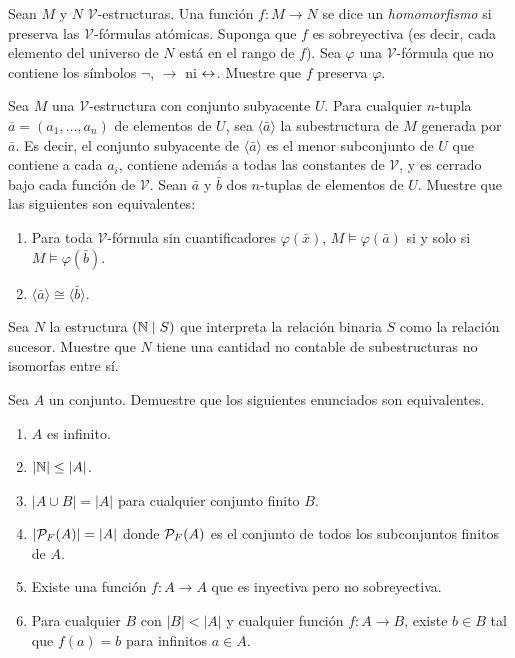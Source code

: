 \message{ !name(main.tex)}\documentclass[12pt,a4paper]{book}
\newcommand{\VV}{\mathcal{V}}
\begin{document}
    \begin{ejercicio}
        Sean $M$ y $N$ $\VV$-estructuras. Una función $f:M\rightarrow N$ se dice un \textit{homomorfismo} si preserva las
        $\VV$-fórmulas atómicas. Suponga que $f$ es sobreyectiva (es decir, cada elemento del universo de $N$ está en el
        rango de $f$). Sea $\varphi$ una $\VV$-fórmula que no contiene los símbolos $\neg$, $\rightarrow$ ni $\leftrightarrow$.
        Muestre que $f$ preserva $\varphi$.
    \end{ejercicio}

    \begin{ejercicio}
        Sea $M$ una $\VV$-estructura con conjunto subyacente $U$. Para cualquier $n$-tupla $\bar{a}=(a_{1},\dots,a_{n})$
        de elementos de $U$, sea $\langle\bar{a}\rangle$ la subestructura de $M$ generada por $\bar{a}$. Es decir, el
        conjunto subyacente de $\langle\bar{a}\rangle$ es el menor subconjunto de $U$ que contiene a cada $a_{i}$, contiene
        además a todas las constantes de $\VV$, y es cerrado bajo cada función de $\VV$. Sean $\bar{a}$ y $\bar{b}$ dos
        $n$-tuplas de elementos de $U$. Muestre que las siguientes son equivalentes:
        \begin{enumerate}
            \item[(i)] Para toda $\VV$-fórmula sin cuantificadores $\varphi(\bar{x})$, $M\models\varphi(\bar{a})$ si y
            solo si $M\models\varphi(\bar{b})$.
            \item[(ii)] $\langle\bar{a}\rangle\cong\langle\bar{b}\rangle$.
        \end{enumerate}
    \end{ejercicio}

    \begin{ejercicio}
        Sea $N$ la estructura $(\mathbb{N}\mid S)$ que interpreta la relación binaria $S$ como la relación sucesor. Muestre que
        $N$ tiene una cantidad no contable de subestructuras no isomorfas entre sí.
    \end{ejercicio}

    \begin{ejercicio}
        Sea $A$ un conjunto. Demuestre que los siguientes enunciados son equivalentes.
        \begin{enumerate}
            \item[(i)] $A$ es infinito.
            \item[(ii)] $|\mathbb{N}|\leq|A|$.
            \item[(iii)] $|A\cup B|=|A|$ para cualquier conjunto finito $B$.
            \item[(iv)] $|\mathcal{P}_{F}(A)|=|A|$ donde $\mathcal{P}_{F}(A)$ es el conjunto de todos los subconjuntos finitos de $A$.
            \item[(v)] Existe una función $f:A\rightarrow A$ que es inyectiva pero no sobreyectiva.
            \item[(vi)] Para cualquier $B$ con $|B|<|A|$ y cualquier función $f:A\rightarrow B$, existe $b\in B$ tal que
            $f(a)=b$ para infinitos $a\in A$.
        \end{enumerate}
    \end{ejercicio}
\end{document}
